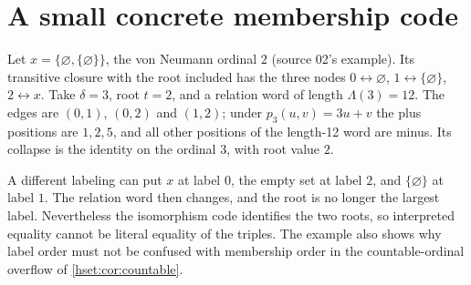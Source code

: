 \documentclass[11pt,letterpaper]{article}
\theoremstyle{definition}
\theoremstyle{remark}
\begin{document}
\section{A small concrete membership code}
\label{hset:app:example}

Let $x=\{\varnothing,\{\varnothing\}\}$, the von Neumann ordinal $2$ (source 02's
example). Its transitive closure with the root included has the three nodes
$0\leftrightarrow\varnothing$, $1\leftrightarrow\{\varnothing\}$,
$2\leftrightarrow x$. Take $\delta=3$, root $t=2$, and a relation word of length
$\Lambda(3)=12$. The edges are $(0,1)$, $(0,2)$ and $(1,2)$; under
$p_3(u,v)=3u+v$ the plus positions are $1,2,5$, and all other positions of the
length-12 word are minus. Its collapse is the identity on the ordinal $3$, with
root value $2$.

A different labeling can put $x$ at label $0$, the empty set at label $2$, and
$\{\varnothing\}$ at label $1$. The relation word then changes, and the root is no
longer the largest label. Nevertheless the isomorphism code identifies the two
roots, so interpreted equality cannot be literal equality of the triples. The
example also shows why label order must not be confused with membership order in
the countable-ordinal overflow of \cref{hset:cor:countable}.
\end{document}

